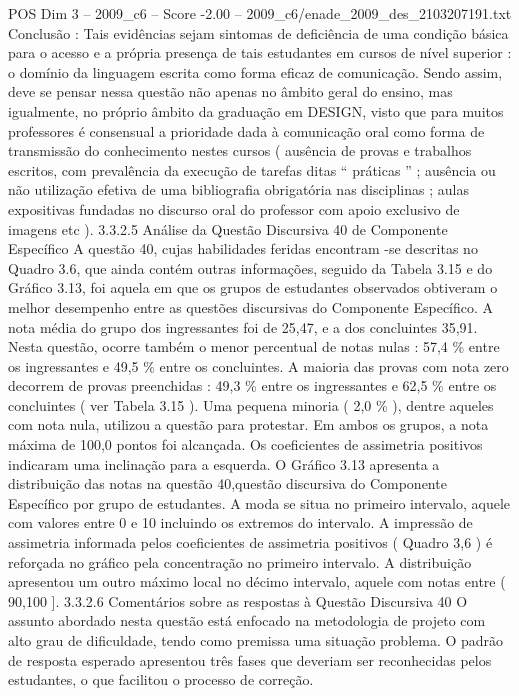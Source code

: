 \begin{textsample}{POS Dim 3 – 2009\_c6 – Score -2.00 – 2009\_c6/enade\_2009\_des\_2103207191.txt}
Conclusão : Tais evidências sejam sintomas de deficiência de uma condição básica para o acesso e a própria presença de tais estudantes em cursos de nível superior : o domínio da linguagem escrita como forma eficaz de comunicação.
Sendo assim, deve se pensar nessa questão não apenas no âmbito geral do ensino, mas igualmente, no próprio âmbito da graduação em DESIGN, visto que para muitos professores é consensual a prioridade dada à comunicação oral como forma de transmissão do conhecimento nestes cursos ( ausência de provas e trabalhos escritos, com prevalência da execução de tarefas ditas “ práticas ” ; ausência ou não utilização efetiva de uma bibliografia obrigatória nas disciplinas ; aulas expositivas fundadas no discurso oral do professor com apoio exclusivo de imagens etc ). 3.3.2.5 Análise da Questão Discursiva 40 de Componente Específico A questão 40, cujas habilidades feridas encontram -se descritas no Quadro 3.6, que ainda contém outras informações, seguido da Tabela 3.15 e do Gráfico 3.13, foi aquela em que os grupos de estudantes observados obtiveram o melhor desempenho entre as questões discursivas do Componente Específico.
A nota média do grupo dos ingressantes foi de 25,47, e a dos concluintes 35,91.
Nesta questão, ocorre também o menor percentual de notas nulas : 57,4 \% entre os ingressantes e 49,5 \% entre os concluintes.
A maioria das provas com nota zero decorrem de provas preenchidas : 49,3 \% entre os ingressantes e 62,5 \% entre os concluintes ( ver Tabela 3.15 ).
Uma pequena minoria ( 2,0 \% ), dentre aqueles com nota nula, utilizou a questão para protestar.
Em ambos os grupos, a nota máxima de 100,0 pontos foi alcançada.
Os coeficientes de assimetria positivos indicaram uma inclinação para a esquerda.
O Gráfico 3.13 apresenta a distribuição das notas na questão 40,questão discursiva do Componente Específico por grupo de estudantes.
A moda se situa no primeiro intervalo, aquele com valores entre 0 e 10 incluindo os extremos do intervalo.
A impressão de assimetria informada pelos coeficientes de assimetria positivos ( Quadro 3,6 ) é reforçada no gráfico pela concentração no primeiro intervalo.
A distribuição apresentou um outro máximo local no décimo intervalo, aquele com notas entre ( 90,100 ]. 3.3.2.6 Comentários sobre as respostas à Questão Discursiva 40 O assunto abordado nesta questão está enfocado na metodologia de projeto com alto grau de dificuldade, tendo como premissa uma situação problema.
O padrão de resposta esperado apresentou três fases que deveriam ser reconhecidas pelos estudantes, o que facilitou o processo de correção.

\end{textsample}
